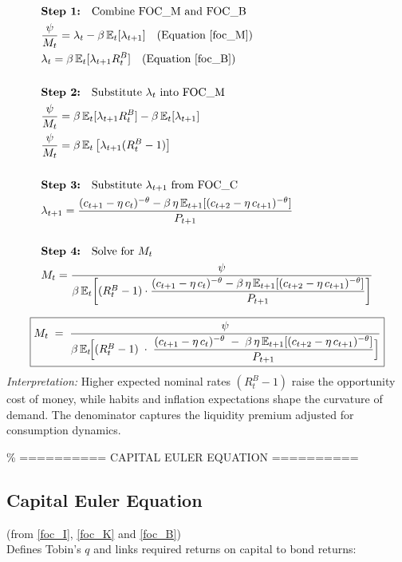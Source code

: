 \documentclass[11pt,preprint]{elsarticle}
\numberwithin{equation}{section}
\numberwithin{figure}{section}
\numberwithin{table}{section}
\begin{document}
\begin{align*}
& \textbf{Step 1:} \quad \text{Combine FOC\_M and FOC\_B} \\
& \frac{\psi}{M_t} = \lambda_t - \beta\,\mathbb{E}_t[\lambda_{t+1}] \quad \text{(Equation \ref{foc_M})} \\
& \lambda_t = \beta\,\mathbb{E}_t[\lambda_{t+1}R_t^B] \quad \text{(Equation \ref{foc_B})} \\
& \\
& \textbf{Step 2:} \quad \text{Substitute } \lambda_t \text{ into FOC\_M} \\
& \frac{\psi}{M_t} = \beta\,\mathbb{E}_t[\lambda_{t+1}R_t^B] - \beta\,\mathbb{E}_t[\lambda_{t+1}] \\
& \frac{\psi}{M_t} = \beta\,\mathbb{E}_t\left[\lambda_{t+1}(R_t^B - 1)\right] \\
& \\
& \textbf{Step 3:} \quad \text{Substitute } \lambda_{t+1} \text{ from FOC\_C} \\
& \lambda_{t+1} = \frac{(c_{t+1} - \eta\,c_t)^{-\theta} - \beta\,\eta\,\mathbb{E}_{t+1}[(c_{t+2} - \eta\,c_{t+1})^{-\theta}]}{P_{t+1}} \\
& \\
& \textbf{Step 4:} \quad \text{Solve for } M_t \\
& M_t = \frac{\psi}{\beta\,\mathbb{E}_t\!\left[ (R_t^B - 1) \cdot \dfrac{(c_{t+1} - \eta\,c_t)^{-\theta} - \beta\,\eta\,\mathbb{E}_{t+1}[(c_{t+2} - \eta\,c_{t+1})^{-\theta}]}{P_{t+1}} \right]}
\end{align*}

\[
\boxed{
  M_t
  \;=\;
  \frac{\psi}
       {\beta\,\mathbb{E}_t\!\Bigl[
         (R_t^B - 1)
         \;\cdot\;
         \dfrac{(c_{t+1} - \eta\,c_t)^{-\theta}
               \;-\;
               \beta\,\eta\,\mathbb{E}_{t+1}[(c_{t+2} - \eta\,c_{t+1})^{-\theta}]}
              {P_{t+1}}
       \Bigr]}
}
\] \textit{Interpretation:} Higher expected nominal rates
\((R_t^B - 1)\) raise the opportunity cost of money, while habits and
inflation expectations shape the curvature of demand. The denominator
captures the liquidity premium adjusted for consumption dynamics.

\% ========== CAPITAL EULER EQUATION ==========

\subsection*{Capital Euler Equation}

(from \eqref{foc_I}, \eqref{foc_K} and \eqref{foc_B})\\
Defines Tobin's \(q\) and links required returns on capital to bond
returns:
\end{document}
